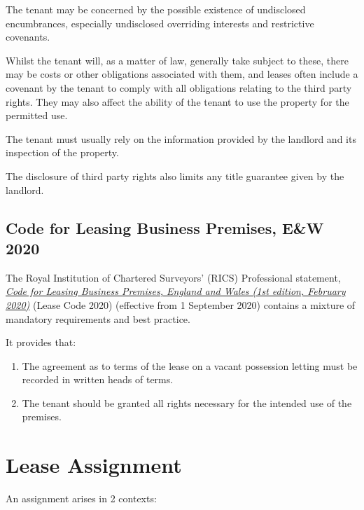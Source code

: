 \documentclass[
]{article}
\providecommand{\tightlist}{%
  \setlength{\itemsep}{0pt}\setlength{\parskip}{0pt}}
\begin{document}
The tenant may be concerned by the possible existence of undisclosed
encumbrances, especially undisclosed overriding interests and
restrictive covenants.

Whilst the tenant will, as a matter of law, generally take subject to
these, there may be costs or other obligations associated with them, and
leases often include a covenant by the tenant to comply with all
obligations relating to the third party rights. They may also affect the
ability of the tenant to use the property for the permitted use.

The tenant must usually rely on the information provided by the landlord
and its inspection of the property.

The disclosure of third party rights also limits any title guarantee
given by the landlord.

\hypertarget{code-for-leasing-business-premises-ew-2020}{%
\subsection{Code for Leasing Business Premises, E\&W
2020}\label{code-for-leasing-business-premises-ew-2020}}

The Royal Institution of Chartered Surveyors' (RICS) Professional
statement,
\emph{\href{https://www.rics.org/globalassets/code-for-leasing_ps-version_feb-2020.pdf}{Code
for Leasing Business Premises, England and Wales (1st edition, February
2020)}} (Lease Code 2020) (effective from 1 September 2020) contains a
mixture of mandatory requirements and best practice.

It provides that:

\begin{enumerate}
\tightlist
\item
  The agreement as to terms of the lease on a vacant possession letting
  must be recorded in written heads of terms.
\item
  The tenant should be granted all rights necessary for the intended use
  of the premises.
\end{enumerate}

\hypertarget{lease-assignment}{%
\section{Lease Assignment}\label{lease-assignment}}

An assignment arises in 2 contexts:
\end{document}
